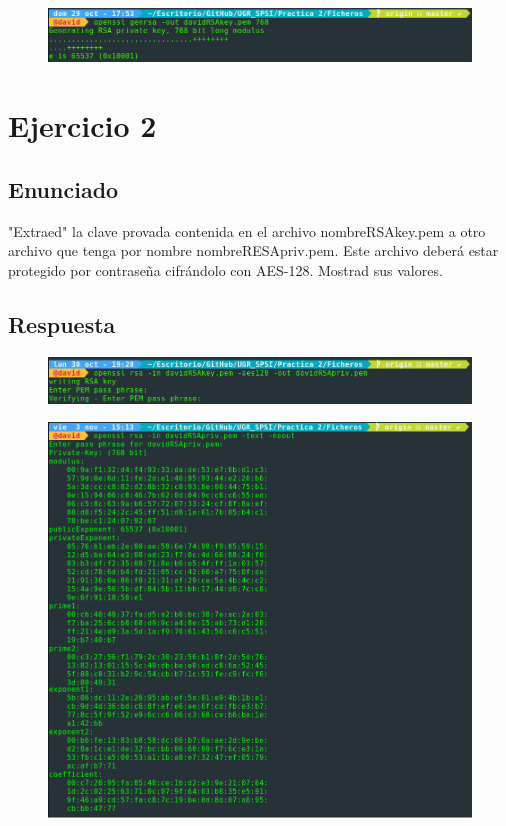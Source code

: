 \documentclass[10pt,a4paper,spanish]{report}
\begin{document}
\begin{figure}[!hbp]
 \centering  \includegraphics[width=1\textwidth]{./Imagenes/1.png}
\end{figure}


\chapter{Ejercicio 2}

\section{Enunciado}
\noindent
"Extraed" la clave provada contenida en el archivo nombreRSAkey.pem a otro archivo que tenga por nombre nombreRESApriv.pem. Este archivo deberá estar protegido por contraseña cifrándolo con AES-128. Mostrad sus valores.

\section{Respuesta}
\noindent

\begin{figure}[!hbp]
 \centering  \includegraphics[width=1\textwidth]{./Imagenes/2.png}
\end{figure}

\begin{figure}[!hbp]
 \centering  \includegraphics[width=1\textwidth]{./Imagenes/3.png}
\end{figure}
\end{document}
